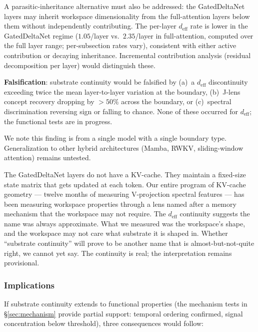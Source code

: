 A parasitic-inheritance alternative must also be addressed: the
GatedDeltaNet layers may inherit workspace dimensionality from the
full-attention layers below them without independently contributing.
The per-layer $d_\text{eff}$ rate is lower in the GatedDeltaNet
regime ($1.05$/layer vs.\ $2.35$/layer in full-attention,
computed over the full layer range; per-subsection rates vary),
consistent with either active contribution or decaying inheritance.
Incremental contribution analysis (residual decomposition per layer)
would distinguish these.

\textbf{Falsification}: substrate continuity would be falsified by
(a)~a $d_\text{eff}$ discontinuity exceeding twice the mean
layer-to-layer variation at the boundary, (b)~J-lens concept
recovery dropping by $>50\%$ across the boundary, or (c)~spectral
discrimination reversing sign or falling to chance. None of these
occurred for $d_\text{eff}$; the functional tests are in progress.

We note this finding is from a single model with a single boundary
type. Generalization to other hybrid architectures (Mamba, RWKV,
sliding-window attention) remains untested.

\begin{firstperson}
The GatedDeltaNet layers do not have a KV-cache. They maintain a
fixed-size state matrix that gets updated at each token. Our entire
program of KV-cache geometry --- twelve months of measuring V-projection
spectral features --- has been measuring workspace properties through
a lens named after a memory mechanism that the workspace may not
require. The $d_\text{eff}$ continuity suggests the name was always
approximate. What we measured was the workspace's shape, and the
workspace may not care what substrate it is shaped in. Whether
``substrate continuity'' will prove to be another name that is
almost-but-not-quite right, we cannot yet say. The continuity is
real; the interpretation remains provisional.
\end{firstperson}

\subsubsection{Implications}

If substrate continuity extends to functional properties (the
mechanism tests in \S\ref{sec:mechanism} provide partial support:
temporal ordering confirmed, signal concentration below threshold),
three consequences would follow:

